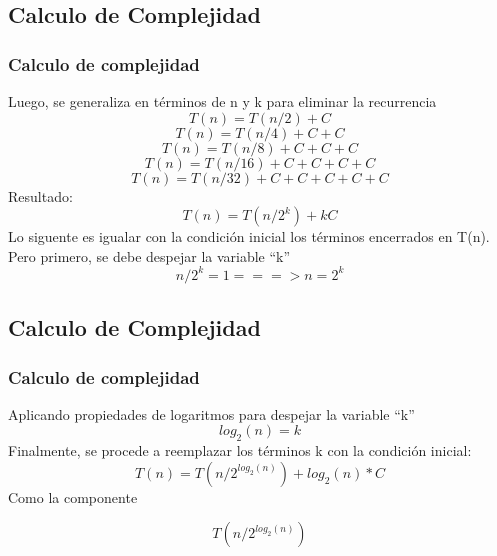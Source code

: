 \documentclass{beamer}
\begin{document}
	\subsection{Calculo de Complejidad}

		\begin{frame}
			\frametitle{Calculo de complejidad}
		Luego, se generaliza en términos de n y k para eliminar la recurrencia
			\begin{equation}
					T(n) = T(n/2) + C
				\end{equation}
			\begin{equation}
					T(n) = T(n/4) + C + C
				\end{equation}
             \begin{equation}
					T(n) = T(n/8) + C + C + C
				\end{equation}
				  \begin{equation}
					T(n) = T(n/16) + C + C + C + C
				\end{equation}
			  \begin{equation}
					T(n) = T(n/32) + C + C + C + C + C
				\end{equation}
				Resultado:
			  \begin{equation}
					T(n) = T(n/2^k) + kC
				\end{equation}
				Lo siguente es igualar con la condición inicial los términos encerrados en T(n). Pero primero, se debe despejar la variable “k”
              \begin{equation}
					n/2^k = 1 ===> n = 2^k
				\end{equation}
				
		\end{frame}
		
		
		\subsection{Calculo de Complejidad}

		\begin{frame}
			\frametitle{Calculo de complejidad}
		Aplicando propiedades de logaritmos para despejar la variable “k”
			\begin{equation}
					log_2 {(n)} = k
				\end{equation}
		Finalmente, se procede a reemplazar los términos k con la condición inicial:
			\begin{equation}
					T(n) = T(n/2^{log_2 {(n)}}) + log_2 {(n)} * C
				\end{equation}
		Como la componente 

               \begin{equation}
                    T(n/2^{log_2 {(n)}})
                   \end{equation}


		\end{frame}
\end{document}
